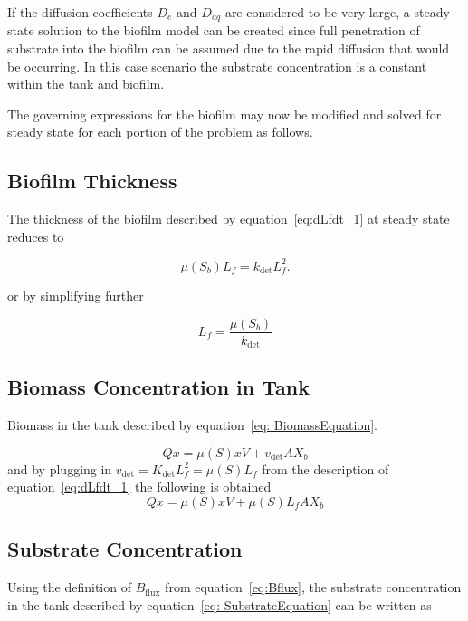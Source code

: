 \documentclass[letterpaper, twoside]{article}
\numberwithin{equation}{section}
\begin{document}
If the diffusion coefficients $D_e$ and $D_{aq}$ are considered to be very large, a steady state solution to the biofilm model can be created since full penetration of substrate into the biofilm can be assumed due to the rapid diffusion that would be occurring. In this case scenario the substrate concentration is a constant within the tank and biofilm.

The governing expressions for the biofilm may now be modified and solved for steady state for each portion of the problem as follows.

\subsection{Biofilm Thickness}
The thickness of the biofilm described by equation~\ref{eq:dLfdt_1} at steady state reduces to 

\begin{equation*}
   {\bar\mu(S_b) L_f}={k_{\mathrm{det}}L_f^2}.
\end{equation*}
 
 or by simplifying further
 
 \begin{equation}
  \label{eq:Lfsteady}
  {L_f}=\frac{\bar\mu(S_b)}{k_{\mathrm{det}}}
\end{equation}

\subsection{Biomass Concentration in Tank}
Biomass in the tank described by equation~\ref{eq: BiomassEquation}. 

\begin{equation*} 
  Qx = \mu(S) xV +v_{\mathrm{det}} A X_b
\end{equation*}
and by plugging in $v_{\mathrm{det}}= K_\mathrm{det} L_f^2 = \mu(S) L_f$ from the description of equation~\ref{eq:dLfdt_1} the following is obtained
\begin{equation}
 \label{eq:biomass steady}
  Qx = \mu(S) xV +\mu(S) L_f A X_b
\end{equation}

\subsection{Substrate Concentration}
Using the definition of $B_{\mathrm{flux}}$ from equation~\ref{eq:Bflux}, the substrate concentration in the tank described by equation~\ref{eq: SubstrateEquation} can be written as
\end{document}
